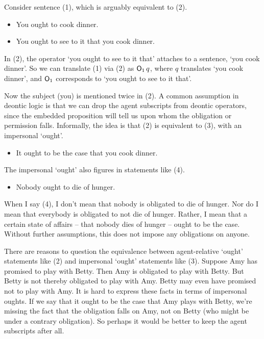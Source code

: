 Consider sentence (1), which is arguably equivalent to (2).
\begin{itemize}[leftmargin=10mm]
\itemsep-1mm
\item[(1)] You ought to cook dinner.
\item[(2)] You ought to see to it that you cook dinner.
\end{itemize}
In (2), the operator `you ought to see to it that' attaches to a sentence, `you
cook dinner'. So we can translate (1) via (2) as $\operatorname{\mathsf{O}}_1 q$, where $q$ translates
`you cook dinner', and $\operatorname{\mathsf{O}}_1$ corresponds to `you ought to see to it that'.

Now the subject (you) is mentioned twice in (2). A common assumption in deontic
logic is that we can drop the agent subscripts from deontic operators, since the
embedded proposition will tell us upon whom the obligation or permission falls.
Informally, the idea is that (2) is equivalent to (3), with an impersonal
`ought'.
\begin{itemize}[leftmargin=10mm]
\itemsep1mm
\item[(3)] It ought to be the case that you cook dinner.
\end{itemize}

The impersonal `ought' also figures in statements like (4).
\begin{itemize}[leftmargin=10mm]
\itemsep1mm
\item[(4)] Nobody ought to die of hunger.
\end{itemize}
When I say (4), I don't mean that nobody is obligated to die of hunger. Nor do I
mean that everybody is obligated to not die of hunger. Rather, I mean that a
certain state of affairs -- that nobody dies of hunger -- ought to be the case.
Without further assumptions, this does not impose any obligations on anyone.


There are reasons to question the equivalence between agent-relative `ought'
statements like (2) and impersonal `ought' statements like (3).
Suppose Amy has promised to play with Betty. Then Amy is obligated to play with
Betty. But Betty is not thereby obligated to play with Amy. Betty may even have
promised not to play with Amy. It is hard to express these facts in terms of
impersonal oughts. If we say that it ought to be the case that Amy plays with
Betty, we're missing the fact that the obligation falls on Amy, not on Betty
(who might be under a contrary obligation). So perhaps it would be better to
keep the agent subscripts after all.

